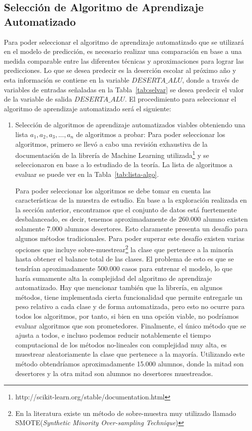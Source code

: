 \subsection{Selección de Algoritmo de Aprendizaje Automatizado}
Para poder seleccionar el algoritmo de aprendizaje automatizado que se utilizará en el modelo de predicción, es necesario realizar una comparación en base a una medida comparable entre las diferentes técnicas y aproximaciones para lograr las predicciones. Lo que se desea predecir es la deserción escolar al próximo año y esta información se contiene en la variable $DESERTA\_ALU$, donde a través de variables de entradas señaladas en la Tabla~\ref{tab:selvar} se desea predecir el valor de la variable de salida $DESERTA\_ALU$.
El procedimiento para seleccionar el algoritmo de aprendizaje automatizado será el siguiente:
\begin{enumerate}
\item Selección de algoritmos de aprendizaje automatizados viables obteniendo una lista $a_1, a_2, a_3, ..., a_n$ de algoritmos a probar: Para poder seleccionar los algoritmos, primero se llevó a cabo una revisión exhaustiva de la documentación de la librería de Machine Learning utilizada\footnote{http://scikit-learn.org/stable/documentation.html} y se seleccionaron en base a lo estudiado de la teoría. La lista de algoritmos a evaluar se puede ver en la Tabla~\ref{tab:lista-algo}.

Para poder seleccionar los algoritmos se debe tomar en cuenta las características de la muestra de estudio. En base a la exploración realizada en la sección anterior, encontramos que el conjunto de datos está fuertemente desbalanceado, es decir, tenemos aproximadamente de 260.000 alumno existen solamente 7.000 alumnos desertores. Esto claramente presenta un desafío para algunos métodos tradicionales. Para poder superar este desafío existen varias opciones que incluye sobre-muestrear\footnote{En la literatura existe un método de sobre-muestra muy utilizado llamado SMOTE(\textit{Synthetic Minority Over-sampling Technique})} la clase que pertenece a la minoría hasta obtener el balance total de las clases. El problema de esto es que se tendrían aproximadamente 500.000 casos para entrenar el modelo, lo que haría sumamente alta la complejidad del algoritmo de aprendizaje automatizado. Hay que mencionar también que la librería, en algunos métodos, tiene implementada cierta funcionalidad que permite entregarle un peso relativo a cada clase y de forma automatizada, pero esto no ocurre para todos los algoritmos, por tanto, si bien en una opción viable, no podríamos evaluar algoritmos que son prometedores. Finalmente, el único método que se ajusta a todos, e incluso podemos reducir notablemente el tiempo computacional de los métodos no-lineales con complejidad muy alta, es muestrear aleatoriamente la clase que pertenece a la mayoría. Utilizando este método obtendríamos aproximadamente 15.000 alumnos, donde la mitad son desertores y la otra mitad son alumnos no desertores muestreados.


\end{enumerate}
